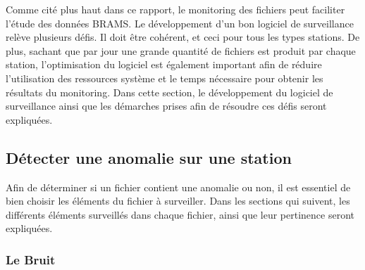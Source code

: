 \documentclass[11pt]{article}
\begin{document}
Comme cité plus haut dans ce rapport, le monitoring des fichiers peut faciliter l'étude des données BRAMS.
Le développement d'un bon logiciel de surveillance relève plusieurs défis.
Il doit être cohérent, et ceci pour tous les types stations.
De plus, sachant que par jour une grande quantité de fichiers est produit par chaque station, l'optimisation du logiciel est également important afin de réduire l'utilisation des ressources système et le temps nécessaire pour obtenir les résultats du monitoring.
Dans cette section, le développement du logiciel de surveillance ainsi que les démarches prises afin de résoudre ces défis seront expliquées.

\subsection{Détecter une anomalie sur une station}

Afin de déterminer si un fichier contient une anomalie ou non, il est essentiel de bien choisir les éléments du fichier à surveiller.
Dans les sections qui suivent, les différents éléments surveillés dans chaque fichier, ainsi que leur pertinence seront expliquées.

\subsubsection{Le Bruit}
\end{document}
